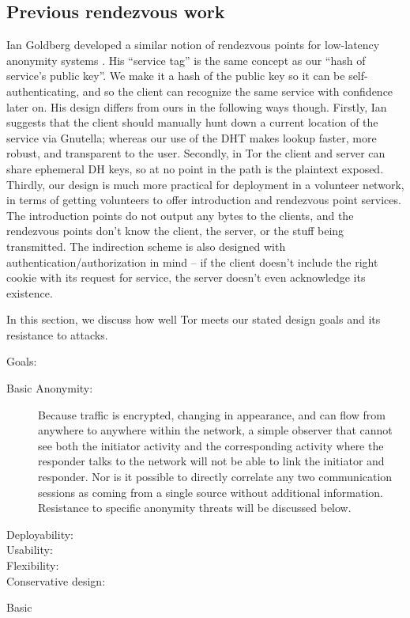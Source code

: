 \documentclass[times,10pt,twocolumn]{article}
\begin{document}
\subsection{Previous rendezvous work}

Ian Goldberg developed a similar notion of rendezvous points for
low-latency anonymity systems \cite{ian-thesis}. His ``service tag''
is the same concept as our ``hash of service's public key''. We make it
a hash of the public key so it can be self-authenticating, and so the
client can recognize the same service with confidence later on. His
design differs from ours in the following ways though. Firstly, Ian
suggests that the client should manually hunt down a current location of
the service via Gnutella; whereas our use of the DHT makes lookup faster,
more robust, and transparent to the user. Secondly, in Tor the client
and server can share ephemeral DH keys, so at no point in the path is
the plaintext
exposed. Thirdly, our design is much more practical for deployment in a
volunteer network, in terms of getting volunteers to offer introduction
and rendezvous point services. The introduction points do not output any
bytes to the clients, and the rendezvous points don't know the client,
the server, or the stuff being transmitted. The indirection scheme
is also designed with authentication/authorization in mind -- if the
client doesn't include the right cookie with its request for service,
the server doesn't even acknowledge its existence.

\label{sec:analysis}

In this section, we discuss how well Tor meets our stated design goals
and its resistance to attacks.

Goals:
\begin{description}
\item [Basic Anonymity:] Because traffic is encrypted, changing in
  appearance, and can flow from anywhere to anywhere within the
  network, a simple observer that cannot see both the initiator
  activity and the corresponding activity where the responder talks to
  the network will not be able to link the initiator and responder.
  Nor is it possible to directly correlate any two communication
  sessions as coming from a single source without additional
  information. Resistance to specific anonymity threats will be discussed
  below.

\item[Deployability:]

\item[Usability:] 
\item[Flexibility:] 
\item[Conservative design:] 
\end{description}
Basic 
\end{document}

